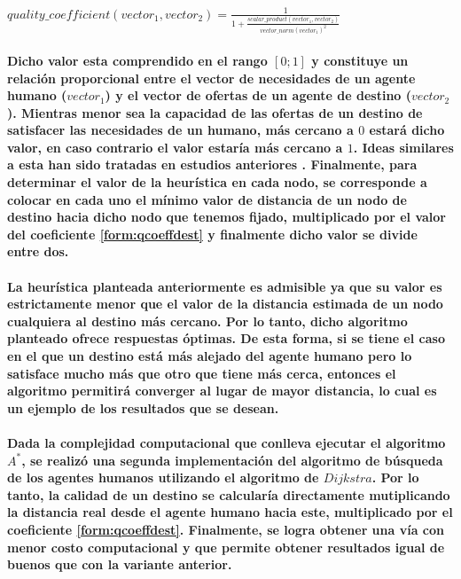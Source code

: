 \documentclass[12pt]{amsart}
\begin{document}
\paragraph{$quality\_coefficient(vector_1, vector_2) =\frac{1} {1 + \frac{scalar\_product(vector_1, vector_2)}{vector\_norm(vector_1)^2}}$\label{form:qcoeffdest}}

\paragraph{Dicho valor esta comprendido en el rango $[0 ; 1]$ y constituye un relación proporcional entre el vector de necesidades de un agente humano ($vector_1$) y el vector de ofertas de un agente de destino ($vector_2$). Mientras menor sea la capacidad de las ofertas de un destino de satisfacer las necesidades de un humano, más cercano a $0$ estará dicho valor, en caso contrario el valor estaría más cercano a $1$. Ideas similares a esta han sido tratadas en estudios anteriores \cite{soa5}. Finalmente, para determinar el valor de la heurística en cada nodo, se corresponde a colocar en cada uno el mínimo valor de distancia de un nodo de destino hacia dicho nodo que tenemos fijado, multiplicado por el valor del coeficiente \ref{form:qcoeffdest} y finalmente dicho valor se divide entre dos.}

\paragraph{La heurística planteada anteriormente es admisible ya que su valor es estrictamente menor que el valor de la distancia estimada de un nodo cualquiera al destino más cercano. Por lo tanto, dicho algoritmo planteado ofrece respuestas óptimas. De esta forma, si se tiene el caso en el que un destino está más alejado del agente humano pero lo satisface mucho más que otro que tiene más cerca, entonces el algoritmo permitirá converger al lugar de mayor distancia, lo cual es un ejemplo de los resultados que se desean.}

\paragraph{Dada la complejidad computacional que conlleva ejecutar el algoritmo $A^*$, se realizó una segunda implementación del algoritmo de búsqueda de los agentes humanos utilizando el algoritmo de $Dijkstra$. Por lo tanto, la calidad de un destino se calcularía directamente mutiplicando la distancia real desde el agente humano hacia este, multiplicado por el coeficiente \ref{form:qcoeffdest}. Finalmente, se logra obtener una vía con menor costo computacional y que permite obtener resultados igual de buenos que con la variante anterior.}
\end{document}
